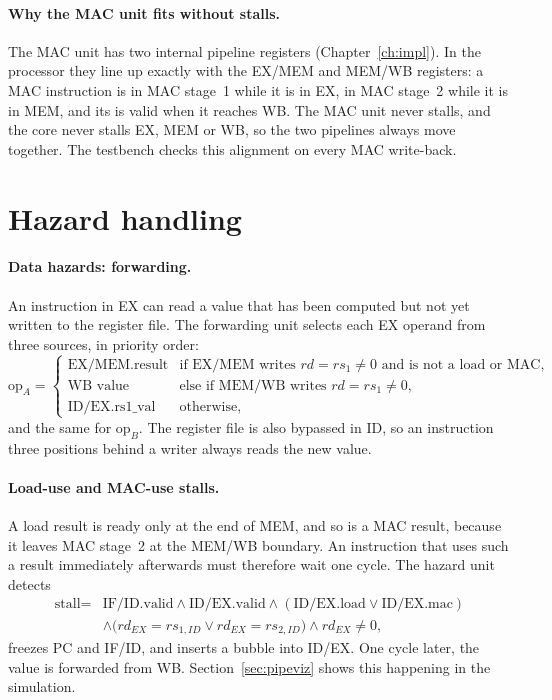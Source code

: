 \paragraph{Why the MAC unit fits without stalls.}
The MAC unit has two internal pipeline registers (Chapter~\ref{ch:impl}). In
the processor they line up exactly with the EX/MEM and MEM/WB registers: a MAC
instruction is in MAC stage~1 while it is in EX, in MAC stage~2 while it is in
MEM, and its  is valid when it reaches WB. The MAC unit
never stalls, and the core never stalls EX, MEM or WB, so the two pipelines
always move together. The testbench checks this alignment on every MAC
write-back.

\section{Hazard handling}
\paragraph{Data hazards: forwarding.}
An instruction in EX can read a value that has been computed but not yet
written to the register file. The forwarding unit selects each EX operand
from three sources, in priority order:
\begin{equation}
  \text{op}_A =
  \begin{cases}
    \text{EX/MEM.result} & \text{if EX/MEM writes } rd = rs_1 \ne 0 \text{ and is not a load or MAC},\\
    \text{WB value}      & \text{else if MEM/WB writes } rd = rs_1 \ne 0,\\
    \text{ID/EX.rs1\_val} & \text{otherwise,}
  \end{cases}
\end{equation}
and the same for $\text{op}_B$. The register file is also bypassed in ID, so
an instruction three positions behind a writer always reads the new value.

\paragraph{Load-use and MAC-use stalls.}
A load result is ready only at the end of MEM, and so is a MAC result, because
it leaves MAC stage~2 at the MEM/WB boundary. An instruction that uses such a
result immediately afterwards must therefore wait one cycle. The hazard unit
detects
\begin{equation}
\begin{split}
  \text{stall} = {} & \text{IF/ID.valid} \wedge \text{ID/EX.valid} \wedge
                      (\text{ID/EX.load} \vee \text{ID/EX.mac}) \\
                    & \wedge \big(rd_{EX}=rs_{1,ID} \vee rd_{EX}=rs_{2,ID}\big) \wedge rd_{EX}\ne 0,
\end{split}
\end{equation}
freezes PC and IF/ID, and inserts a bubble into ID/EX. One cycle later, the
value is forwarded from WB. Section~\ref{sec:pipeviz} shows this happening in
the simulation.


